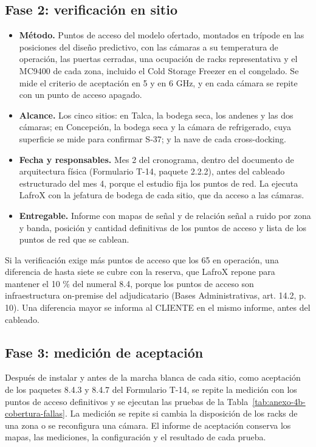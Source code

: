 \subsection*{Fase 2: verificación en sitio}

\begin{itemize}
  \item \textbf{Método.} Puntos de acceso del modelo ofertado, montados en trípode en las posiciones del diseño predictivo, con las cámaras a su temperatura de operación, las puertas cerradas, una ocupación de racks representativa y el MC9400 de cada zona, incluido el Cold Storage Freezer en el congelado. Se mide el criterio de aceptación en 5 y en 6 GHz, y en cada cámara se repite con un punto de acceso apagado.
  \item \textbf{Alcance.} Los cinco sitios: en Talca, la bodega seca, los andenes y las dos cámaras; en Concepción, la bodega seca y la cámara de refrigerado, cuya superficie se mide para confirmar S-37; y la nave de cada cross-docking.
  \item \textbf{Fecha y responsables.} Mes 2 del cronograma, dentro del documento de arquitectura física (Formulario T-14, paquete 2.2.2), antes del cableado estructurado del mes 4, porque el estudio fija los puntos de red. La ejecuta LafroX con la jefatura de bodega de cada sitio, que da acceso a las cámaras.
  \item \textbf{Entregable.} Informe con mapas de señal y de relación señal a ruido por zona y banda, posición y cantidad definitivas de los puntos de acceso y lista de los puntos de red que se cablean.
\end{itemize}

Si la verificación exige más puntos de acceso que los 65 en operación, una diferencia de hasta siete se cubre con la reserva, que LafroX repone para mantener el 10 \% del numeral 8.4, porque los puntos de acceso son infraestructura on-premise del adjudicatario (Bases Administrativas, art. 14.2, p. 10). Una diferencia mayor se informa al CLIENTE en el mismo informe, antes del cableado.

\subsection*{Fase 3: medición de aceptación}

Después de instalar y antes de la marcha blanca de cada sitio, como aceptación de los paquetes 8.4.3 y 8.4.7 del Formulario T-14, se repite la medición con los puntos de acceso definitivos y se ejecutan las pruebas de la Tabla~\ref{tab:anexo-4b-cobertura-fallas}. La medición se repite si cambia la disposición de los racks de una zona o se reconfigura una cámara. El informe de aceptación conserva los mapas, las mediciones, la configuración y el resultado de cada prueba.

\label{fuente-16-anexo-4b-cobertura-fin}

\endgroup
